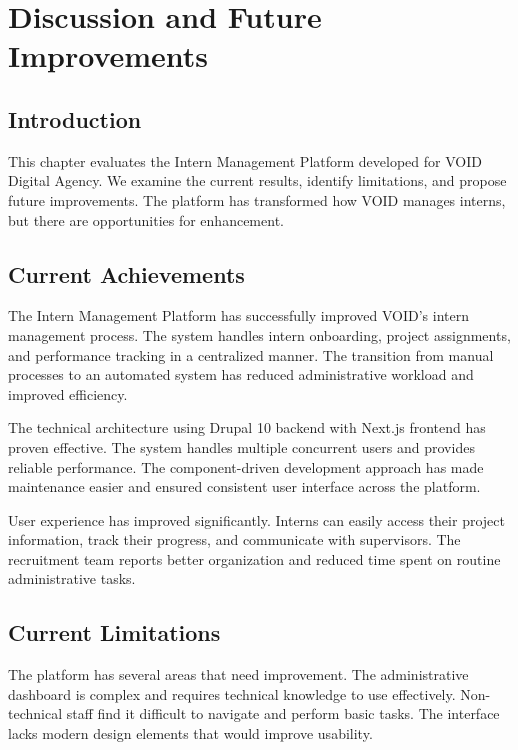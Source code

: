 \chapter{Discussion and Future Improvements}
\label{chap:technical_challenges}

\section{Introduction}
\noindent
This chapter evaluates the Intern Management Platform developed for VOID Digital Agency. We examine the current results, identify limitations, and propose future improvements. The platform has transformed how VOID manages interns, but there are opportunities for enhancement.

\section{Current Achievements}

\noindent
The Intern Management Platform has successfully improved VOID's intern management process. The system handles intern onboarding, project assignments, and performance tracking in a centralized manner. The transition from manual processes to an automated system has reduced administrative workload and improved efficiency.

The technical architecture using Drupal 10 backend with Next.js frontend has proven effective. The system handles multiple concurrent users and provides reliable performance. The component-driven development approach has made maintenance easier and ensured consistent user interface across the platform.

User experience has improved significantly. Interns can easily access their project information, track their progress, and communicate with supervisors. The recruitment team reports better organization and reduced time spent on routine administrative tasks.

\section{Current Limitations}

\noindent
The platform has several areas that need improvement. The administrative dashboard is complex and requires technical knowledge to use effectively. Non-technical staff find it difficult to navigate and perform basic tasks. The interface lacks modern design elements that would improve usability.

